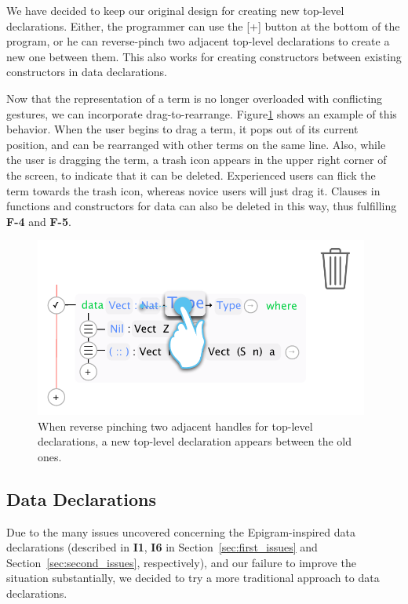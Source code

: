 We have decided to keep our original design for creating new top-level
declarations. Either, the programmer can use the [+] button at the bottom of
the program, or he can reverse-pinch two adjacent top-level declarations to
create a new one between them. This also works for creating constructors
between existing constructors in data declarations.

Now that the representation of a term is no longer overloaded with conflicting
gestures, we can incorporate drag-to-rearrange. Figure\ref{fig:design_drag_to_garbage}
shows an example of this behavior. When the user begins to drag a term, it pops
out of its current position, and can be rearranged with other terms on the same
line. Also, while the user is dragging the term, a trash icon appears in the
upper right corner of the screen, to indicate that it can be deleted. Experienced users can flick the term towards the trash icon, whereas novice users will just drag it.
Clauses in functions and constructors for data can also be deleted in this way, thus fulfilling \textbf{F-4} and \textbf{F-5}.

\begin{figure}
	\centering
		\includegraphics[width=110mm]{diagrams/design_drag_to_garbage.pdf}
	\caption{When reverse pinching two adjacent handles for top-level
	declarations, a new top-level declaration appears between the old ones.}
\label{fig:design_drag_to_garbage}
\end{figure}

\subsection{Data Declarations}
\label{subsec:new_design_data_dec}
Due to the many issues uncovered concerning the Epigram-inspired data declarations (described in \textbf{I1}, \textbf{I6} in Section~\ref{sec:first_issues} and Section~\ref{sec:second_issues}, respectively), and our failure to improve the situation substantially, we decided to try a more traditional approach to data declarations.

